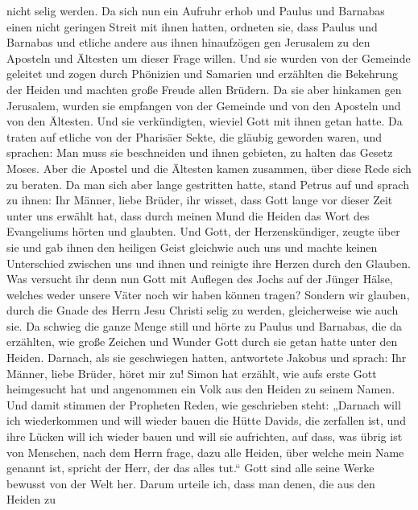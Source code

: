 nicht selig werden.  Da sich nun ein Aufruhr erhob und
Paulus und Barnabas einen nicht geringen Streit mit ihnen hatten,
ordneten sie, dass Paulus und Barnabas und etliche andere aus ihnen
hinaufzögen gen Jerusalem zu den Aposteln und Ältesten um dieser Frage
willen.  Und sie wurden von der Gemeinde geleitet und zogen
durch Phönizien und Samarien und erzählten die Bekehrung der Heiden und
machten große Freude allen Brüdern.  Da sie aber hinkamen
gen Jerusalem, wurden sie empfangen von der Gemeinde und von den
Aposteln und von den Ältesten. Und sie verkündigten, wieviel Gott mit
ihnen getan hatte.  Da traten auf etliche von der Pharisäer
Sekte, die gläubig geworden waren, und sprachen: Man muss sie
beschneiden und ihnen gebieten, zu halten das Gesetz Moses. 
Aber die Apostel und die Ältesten kamen zusammen, über diese Rede sich
zu beraten.  Da man sich aber lange gestritten hatte, stand
Petrus auf und sprach zu ihnen: Ihr Männer, liebe Brüder, ihr wisset,
dass Gott lange vor dieser Zeit unter uns erwählt hat, dass durch meinen
Mund die Heiden das Wort des Evangeliums hörten und glaubten.
 Und Gott, der Herzenskündiger, zeugte über sie und gab
ihnen den heiligen Geist gleichwie auch uns  und machte
keinen Unterschied zwischen uns und ihnen und reinigte ihre Herzen durch
den Glauben.  Was versucht ihr denn nun Gott mit Auflegen
des Jochs auf der Jünger Hälse, welches weder unsere Väter noch wir
haben können tragen?  Sondern wir glauben, durch die Gnade
des Herrn Jesu Christi selig zu werden, gleicherweise wie auch sie.
 Da schwieg die ganze Menge still und hörte zu Paulus und
Barnabas, die da erzählten, wie große Zeichen und Wunder Gott durch sie
getan hatte unter den Heiden.  Darnach, als sie geschwiegen
hatten, antwortete Jakobus und sprach: Ihr Männer, liebe Brüder, höret
mir zu!  Simon hat erzählt, wie aufs erste Gott heimgesucht
hat und angenommen ein Volk aus den Heiden zu seinem Namen.
 Und damit stimmen der Propheten Reden, wie geschrieben
steht:  „Darnach will ich wiederkommen und will wieder
bauen die Hütte Davids, die zerfallen ist, und ihre Lücken will ich
wieder bauen und will sie aufrichten,  auf dass, was übrig
ist von Menschen, nach dem Herrn frage, dazu alle Heiden, über welche
mein Name genannt ist, spricht der Herr, der das alles tut.``
 Gott sind alle seine Werke bewusst von der Welt her.
 Darum urteile ich, dass man denen, die aus den Heiden zu
